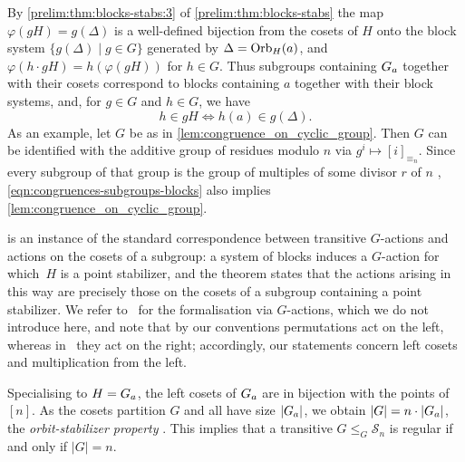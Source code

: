 \begin{remark}
	By \cref{prelim:thm:blocks-stabs:3} of \cref{prelim:thm:blocks-stabs} the map $\varphi(gH) = g(\Delta)$
	is a well-defined bijection from the cosets of $H$ onto the block system $\{ g(\Delta) \mid g \in G\}$
	generated by
	$\Delta = \Orbit{a}{H}$, and $\varphi(h \cdot gH) = h(\varphi(gH))$ for $h \in G$.
	Thus subgroups containing $\Stab{a}{G}$ together with their cosets correspond to blocks
	containing $a$ together with their block systems, and,
	for $g \in G$ and $h \in G$, we have
	\begin{equation}\label{eqn:congruences-subgroups-blocks}
		h \in gH \iff h(a) \in g(\Delta).
	\end{equation}
	As an example, let $G$ be as in \cref{lem:congruence_on_cyclic_group}.
	Then $G$ can be identified with the additive group of residues modulo $n$ via
	$g^{i} \mapsto [i]_{\equiv_n}$.
	Since every subgroup of that group is the group of multiples of some divisor $r$ of $n$
	\cite[Sec.~1.4]{Kurzweil04}, \cref{eqn:congruences-subgroups-blocks} 
	also implies \cref{lem:congruence_on_cyclic_group}.
\end{remark}

\begin{remark}
	 is an instance of the standard correspondence between
	transitive $G$-actions and actions on the cosets of a subgroup: a system of blocks induces a
	$G$-action for which~$H$ is a point stabilizer, and the theorem states that the actions
	arising in this way are precisely those on the cosets of a subgroup containing a point
	stabilizer.
	We refer to~\cite{cameron_1999} for the formalisation via $G$-actions, which we do not
	introduce here, and note that by our conventions permutations act on the left, whereas
	in~\cite{cameron_1999} they act on the right; accordingly, our statements concern left cosets
	and multiplication from the left.
\end{remark}

\begin{remark}\label{prelim:rem:orbit-stab}
	Specialising  to $H = \Stab{a}{G}$,
	the left cosets of $\Stab{a}{G}$ are in bijection with the points of $[n]$.
	As the cosets partition $G$ and all have size $|\Stab{a}{G}|$, we obtain
	$|G| = n \cdot |\Stab{a}{G}|$, the \emph{orbit-stabilizer property}
	\cite{cameron_1999,dixon1996permutation,Kurzweil04,wielandt1964finite}.
	This implies that a transitive $G \le_G \mathcal S_n$ is regular if and only if $|G| = n$.
\end{remark}

